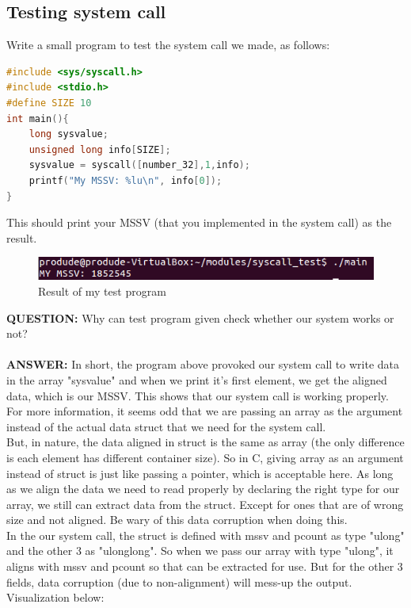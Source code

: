 \documentclass[a4paper]{article}
\begin{document}
\subsection{Testing system call}
Write a small program to test the system call we made, as follows:
\begin{lstlisting}[language=c]
#include <sys/syscall.h>
#include <stdio.h>
#define SIZE 10
int main(){
	long sysvalue;
	unsigned long info[SIZE];
	sysvalue = syscall([number_32],1,info);
	printf("My MSSV: %lu\n", info[0]);
}
\end{lstlisting}
This should print your MSSV (that you implemented in the system call) as the result.
\begin{center}
    \begin{figure}[H]
    \begin{center}
     \includegraphics[scale=1]{testProgram.png}
    \end{center}
    \caption{Result of my test program}
    \end{figure}
\end{center}
\textbf{QUESTION:} Why can test program given check whether our system works or not?\\\\
\textbf{ANSWER:} In short, the program above provoked our system call to write data in the array "sysvalue" and when we print it's first element, we get the aligned data, which is our MSSV. This shows that our system call is working properly.\\
For more information, it seems odd that we are passing an array as the argument instead of the actual data struct that we need for the system call.\\
But, in nature, the data aligned in struct is the same as array (the only difference is each element has different container size). So in C, giving array as an argument instead of struct is just like passing a pointer, which is acceptable here. As long as we align the data we need to read properly by declaring the right type for our array, we still can extract data from the struct. Except for ones that are of wrong size and not aligned. Be wary of this data corruption when doing this.\\
In the our system call, the struct is defined with mssv and pcount as type "ulong" and the other 3 as "ulonglong". So when we pass our array with type "ulong", it aligns with mssv and pcount so that can be extracted for use. But for the other 3 fields, data corruption (due to non-alignment) will mess-up the output. Visualization below:
\end{document}
